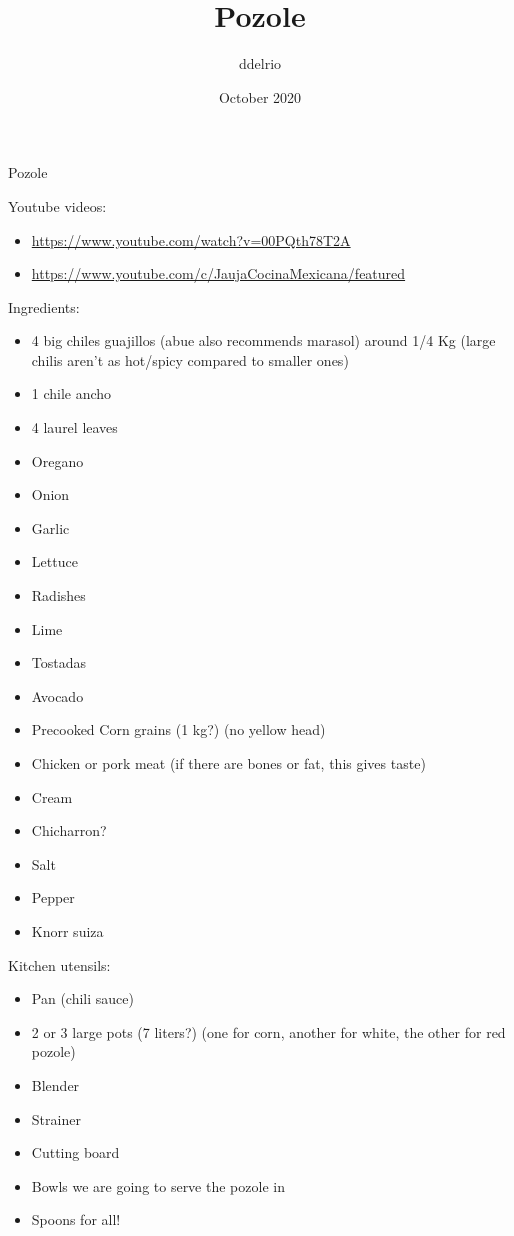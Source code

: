 \documentclass[12pt]{article}
\title{Pozole}
\author{ddelrio }
\date{October 2020}
\begin{document}
Pozole

Youtube videos:
\begin{itemize}
\setlength\itemsep{0em}
    \item \url{https://www.youtube.com/watch?v=00PQth78T2A}%
    \item \url{https://www.youtube.com/c/JaujaCocinaMexicana/featured}
\end{itemize}

Ingredients:
\begin{itemize}
\setlength\itemsep{0em}
    \item 4 big chiles guajillos (abue also recommends marasol) around 1/4 Kg (large chilis aren't as hot/spicy compared to smaller ones)
    \item 1 chile ancho
    \item 4 laurel leaves
    \item Oregano
    \item Onion
    \item Garlic
    \item Lettuce
    \item Radishes
    \item Lime
    \item Tostadas
    \item Avocado
    \item Precooked Corn grains (1 kg?) (no yellow head)
    \item Chicken or pork meat (if there are bones or fat, this gives taste)
    \item Cream
    \item Chicharron?
    \item Salt
    \item Pepper
    \item Knorr suiza
\end{itemize}

Kitchen utensils:
\begin{itemize}
\setlength\itemsep{0em}
    \item Pan (chili sauce)
    \item 2 or 3 large pots (7 liters?) (one for corn, another for white, the other for red pozole)
    \item Blender
    \item Strainer
    \item Cutting board
    \item Bowls we are going to serve the pozole in
    \item Spoons for all!
\end{itemize}
\end{document}
